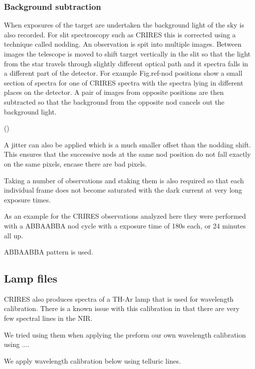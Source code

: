 \subsubsection{Background subtraction}

When exposures of the target are undertaken the background light of the sky is also recorded. For slit spectroscopy such as CRIRES this is corrected using a technique called nodding. An observation is spit into multiple images. Between images the telescope is moved to shift target vertically in the slit so that the light from the star travels through slightly different optical path and it spectra falls in a different part of the detector. 
For example Fig.ref-nod positions show a small section of spectra for one of CRIRES spectra with the spectra lying in different places on the detector. A pair of images from opposite positions are then subtracted so that the background from the opposite nod cancels out the background light.

\missingfigure()

A jitter can also be applied which is a much smaller offset than the nodding shift. This ensures that the successive nods at the same nod position do not fall exactly on the same pixels, encase there are bad pixels.

Taking a number of observations and staking them is also required so that each individual frame does not become saturated with the dark current at very long exposure times.

As an example for the CRIRES observations analyzed here they were performed with a ABBAABBA nod cycle with a exposure time of 180s each, or 24 minutes all up.



ABBAABBA  pattern is used.

\subsection{Lamp files}
CRIRES also produces spectra of a TH-Ar lamp that is used for wavelength calibration. There is a known issue with this calibration in that there are very few spectral lines in the NIR. 

We tried using them when applying the preform our own wavelength calibration using ....

We apply wavelength calibration below using telluric lines.



